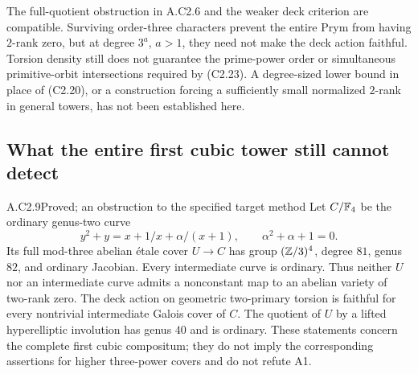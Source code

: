 The full-quotient obstruction in A.C2.6 and the weaker deck
criterion are compatible. Surviving order-three characters
prevent the entire Prym from having $2$-rank zero, but at
degree $3^a$, $a>1$, they need not make the deck action
faithful. Torsion density still does not guarantee the
prime-power order or simultaneous primitive-orbit
intersections required by (C2.23). A degree-sized lower
bound in place of (C2.20), or a construction forcing a
sufficiently small normalized $2$-rank in general towers,
has not been established here.

\subsection{What the entire first cubic tower still cannot detect}

\begin{claim}{A.C2.9}{Proved; an obstruction to the specified target method}
Let $C/\mathbb F_4$ be the ordinary genus-two curve
\[
 y^2+y=x+1/x+\alpha/(x+1),\qquad \alpha^2+\alpha+1=0.
\]
Its full mod-three abelian \'etale cover $U\to C$ has group
$(\mathbb Z/3)^4$, degree $81$, genus $82$, and ordinary Jacobian.
Every intermediate curve is ordinary. Thus neither $U$ nor an
intermediate curve admits a nonconstant map to an abelian variety
of two-rank zero. The deck action on geometric two-primary torsion
is faithful for every nontrivial intermediate Galois cover of $C$.
The quotient of $U$ by a lifted hyperelliptic involution has genus
$40$ and is ordinary. These statements concern the complete first
cubic compositum; they do not imply the corresponding assertions
for higher three-power covers and do not refute A1.
\end{claim}
